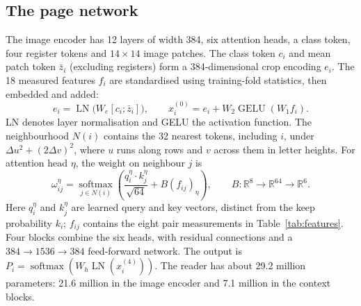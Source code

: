 \documentclass[11pt]{article}
\begin{document}
\subsection{The page network}
The image encoder has 12 layers of width 384, six attention heads, a class token, four register tokens
and $14\times14$ image patches. The class token $c_i$ and mean patch token $\bar z_i$ (excluding registers)
form a 384-dimensional crop encoding $e_i$. The 18 measured features $f_i$ are standardised using
training-fold statistics, then embedded and added:
\begin{equation}
 e_i=\operatorname{LN}\bigl(W_e[c_i;\bar z_i]\bigr),\qquad
 x_i^{(0)}=e_i+W_2\operatorname{GELU}(W_1 f_i).
 \label{eq:embed}
\end{equation}
LN denotes layer normalisation and GELU the activation function.
The neighbourhood $N(i)$ contains the 32 nearest tokens, including $i$, under
$\Delta u^2+(2\Delta v)^2$, where $u$ runs along rows and $v$ across them in letter heights.
For attention head $\eta$, the weight on neighbour $j$ is
\begin{equation}
 \omega_{ij}^{\eta}=\operatorname*{softmax}_{j\in N(i)}
 \left(\frac{q_i^\eta\cdot k_j^\eta}{\sqrt{64}}+B(f_{ij})_\eta\right),
 \qquad B:\mathbb R^8\to\mathbb R^{64}\to\mathbb R^6.
 \label{eq:attention}
\end{equation}
Here $q_i^\eta$ and $k_j^\eta$ are learned query and key vectors, distinct from the keep probability
$k_i$; $f_{ij}$ contains the eight pair measurements in Table~\ref{tab:features}.
Four blocks combine the six heads, with residual connections and a $384\to1536\to384$ feed-forward
network. The output is $P_i=\operatorname{softmax}(W_h\operatorname{LN}(x_i^{(4)}))$.
The reader has about 29.2 million parameters: 21.6 million in the image encoder and 7.1 million in the
context blocks.
\end{document}
